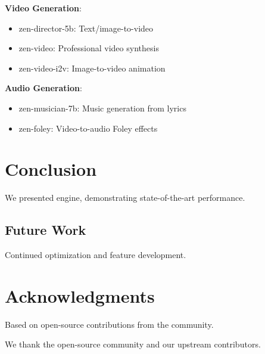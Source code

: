 \documentclass[11pt,a4paper]{article}
\begin{document}
\textbf{Video Generation}:
\begin{itemize}
    \item zen-director-5b: Text/image-to-video
    \item zen-video: Professional video synthesis
    \item zen-video-i2v: Image-to-video animation
\end{itemize}

\textbf{Audio Generation}:
\begin{itemize}
    \item zen-musician-7b: Music generation from lyrics
    \item zen-foley: Video-to-audio Foley effects
\end{itemize}

\section{Conclusion}

We presented engine, demonstrating state-of-the-art performance.

\subsection{Future Work}
Continued optimization and feature development.

\section*{Acknowledgments}

Based on open-source contributions from the community.

We thank the open-source community and our upstream contributors.



\end{document}

